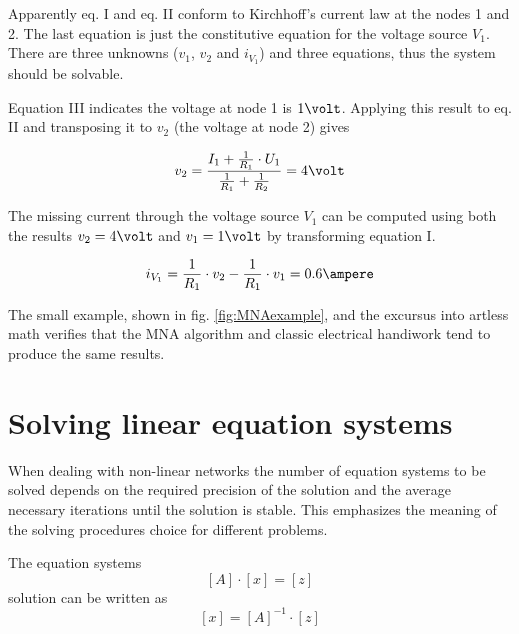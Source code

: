\documentclass[10pt]{report}
\begin{document}
Apparently eq. I and eq. II conform to Kirchhoff's current law at the
nodes 1 and 2.  The last equation is just the constitutive equation
for the voltage source $V_{1}$.  There are three unknowns ($v_{1}$,
$v_{2}$ and $i_{V_{1}}$) and three equations, thus the system should
be solvable.

\addvspace{12pt}

Equation III indicates the voltage at node 1 is $1\volt$.  Applying
this result to eq. II and transposing it to $v_{2}$ (the voltage at
node 2) gives

\begin{equation}
v_{2} = \frac{I_{1} + \frac{1}{R_{1}}\cdot U_{1}}{\frac{1}{R_{1}} + \frac{1}{R_{2}}} = 4\volt
\end{equation}

The missing current through the voltage source $V_{1}$ can be computed
using both the results $v_{2} = 4\volt$ and $v_{1} = 1\volt$ by
transforming equation I.

\begin{equation}
i_{V_{1}} = \frac{1}{R_{1}}\cdot v_{2} - \frac{1}{R_{1}}\cdot v_{1} = 0.6\ampere
\end{equation}

The small example, shown in fig. \ref{fig:MNAexample}, and the
excursus into artless math verifies that the MNA algorithm and classic
electrical handiwork tend to produce the same results.

\section{Solving linear equation systems}

When dealing with non-linear networks the number of equation systems
to be solved depends on the required precision of the solution and the
average necessary iterations until the solution is stable.  This
emphasizes the meaning of the solving procedures choice for different
problems.

\addvspace{12pt}

The equation systems
\begin{equation}
\left[A\right] \cdot \left[x\right] = \left[z\right]
\end{equation}
solution can be written as
\begin{equation}
\left[x\right] = \left[A\right]^{-1} \cdot \left[z\right]
\end{equation}
\end{document}
